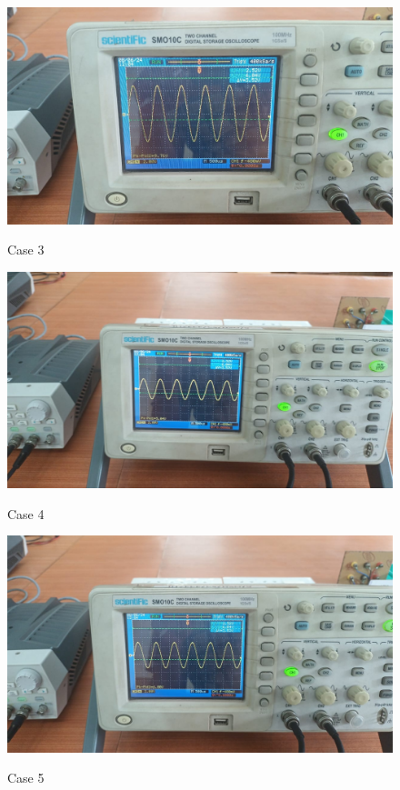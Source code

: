\documentclass{article}
\begin{document}
\newpage
\begin{figure}[!ht]
  \caption{Case 3}
  \includegraphics[width=\textwidth]{33.jpeg}
  \label{fig:33}
\end{figure}

\begin{figure}[!ht]
  \caption{Case 4}
  \includegraphics[width=\textwidth]{34.jpeg}
  \label{fig:34}
\end{figure}
\newpage
\begin{figure}[!ht]
  \caption{Case 5}
  \includegraphics[width=\textwidth]{35.jpeg}
  \label{fig:35}
\end{figure}
\end{document}
